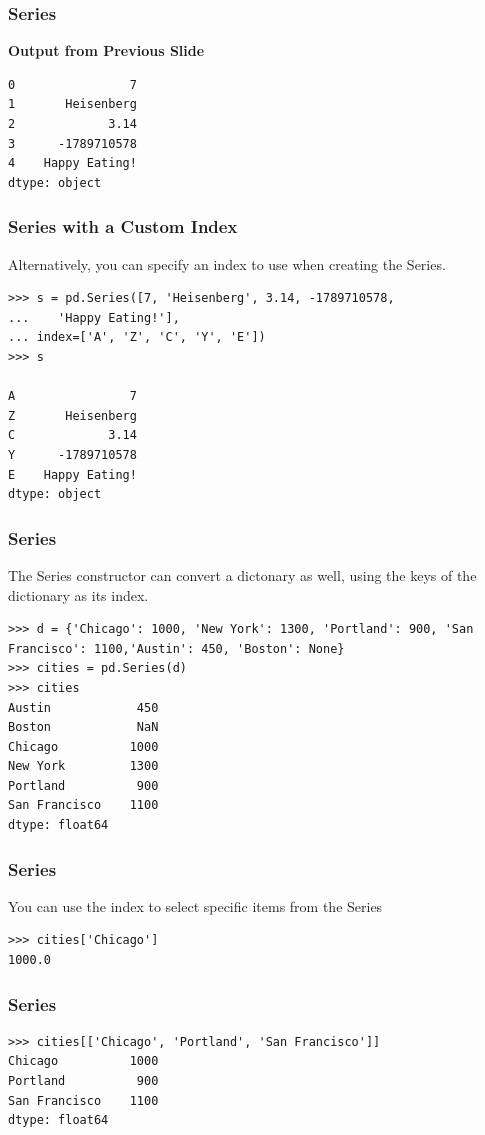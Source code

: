 \begin{frame}[fragile]\frametitle{Series}
\textbf{Output from Previous Slide}
\begin{lstlisting}
0                7
1       Heisenberg
2             3.14
3      -1789710578
4    Happy Eating!
dtype: object
\end{lstlisting}
\end{frame}

\begin{frame}[fragile]\frametitle{Series with a Custom Index}
Alternatively, you can specify an index to use when creating the Series.
\begin{lstlisting}
>>> s = pd.Series([7, 'Heisenberg', 3.14, -1789710578,
...    'Happy Eating!'],
... index=['A', 'Z', 'C', 'Y', 'E'])
>>> s

A                7
Z       Heisenberg
C             3.14
Y      -1789710578
E    Happy Eating!
dtype: object
\end{lstlisting}
\end{frame}

\begin{frame}[fragile]\frametitle{Series}
The Series constructor can convert a dictonary as well, using the keys of the dictionary as its index.
\begin{lstlisting}
>>> d = {'Chicago': 1000, 'New York': 1300, 'Portland': 900, 'San Francisco': 1100,'Austin': 450, 'Boston': None}
>>> cities = pd.Series(d)
>>> cities
Austin            450
Boston            NaN
Chicago          1000
New York         1300
Portland          900
San Francisco    1100
dtype: float64
\end{lstlisting}
\end{frame}

\begin{frame}[fragile]\frametitle{Series}
You can use the index to select specific items from the Series
\begin{lstlisting}
>>> cities['Chicago']
1000.0
\end{lstlisting}
\end{frame}

\begin{frame}[fragile]\frametitle{Series}
\begin{lstlisting}
>>> cities[['Chicago', 'Portland', 'San Francisco']]
Chicago          1000
Portland          900
San Francisco    1100
dtype: float64
\end{lstlisting}
\end{frame}

